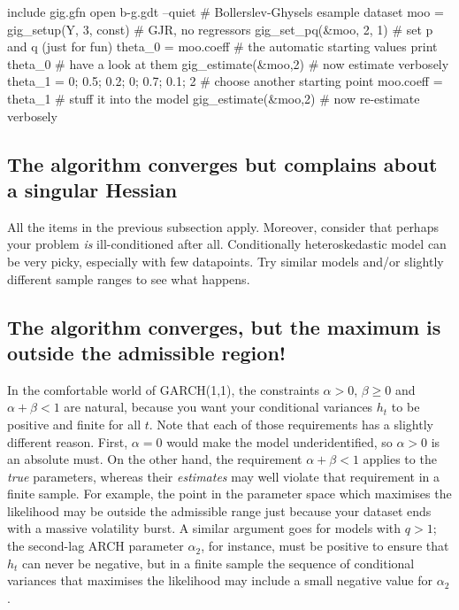 \documentclass[a4paper,11pt]{article}
\begin{document}
\begin{scode}
include gig.gfn
open b-g.gdt --quiet                    # Bollerslev-Ghysels esample dataset
moo = gig_setup(Y, 3, const)            # GJR, no regressors
gig_set_pq(&moo, 2, 1)                  # set p and q (just for fun)
theta_0 = moo.coeff                     # the automatic starting values
print theta_0                           # have a look at them
gig_estimate(&moo,2)                    # now estimate verbosely
theta_1 = {0; 0.5; 0.2; 0; 0.7; 0.1; 2} # choose another starting point
moo.coeff = theta_1                     # stuff it into the model
gig_estimate(&moo,2)                    # now re-estimate verbosely
\end{scode}

\subsection{The algorithm converges but complains about a singular
  Hessian}

All the items in the previous subsection apply. Moreover, consider
that perhaps your problem \emph{is} ill-conditioned after
all. Conditionally heteroskedastic model can be very picky, especially
with few datapoints. Try similar models and/or slightly different
sample ranges to see what happens.

\subsection{The algorithm converges, but the maximum is outside the
  admissible region!}

In the comfortable world of GARCH(1,1), the constraints $\alpha > 0$,
$\beta \ge 0$ and $\alpha + \beta < 1$ are natural, because you want
your conditional variances $h_t$ to be positive and finite for all
$t$. Note that each of those requirements has a slightly different
reason. First, $\alpha = 0$ would make the model underidentified, so
$\alpha > 0$ is an absolute must. On the other hand, the requirement
$\alpha + \beta < 1$ applies to the \emph{true} parameters, whereas
their \emph{estimates} may well violate that requirement in a finite
sample. For example, the point in the parameter space which maximises
the likelihood may be outside the admissible range just because your
dataset ends with a massive volatility burst. A similar argument goes
for models with $q>1$; the second-lag ARCH parameter $\alpha_2$, for
instance, must be positive to ensure that $h_t$ can never be negative,
but in a finite sample the sequence of conditional variances that
maximises the likelihood may include a small negative value for
$\alpha_2$.
\end{document}
